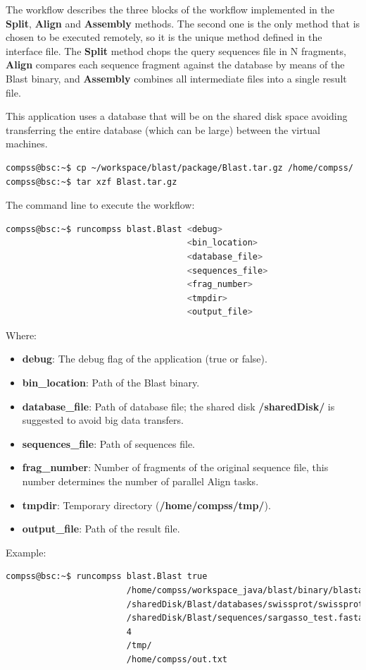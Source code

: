 The workflow describes the three blocks of the workflow implemented in the {\bf Split}, {\bf Align} and 
{\bf Assembly} methods. The second one is the only method that is chosen to be executed remotely, so it 
is the unique method defined in the interface file. The {\bf Split} method chops the query sequences file 
in N fragments, {\bf Align} compares each sequence fragment against the database by means of the Blast 
binary, and {\bf Assembly} combines all intermediate files into a single result file.

This application uses a database that will be on the shared disk space avoiding transferring the entire 
database (which can be large) between the virtual machines.

\begin{lstlisting}[language=bash]
compss@bsc:~$ cp ~/workspace/blast/package/Blast.tar.gz /home/compss/
compss@bsc:~$ tar xzf Blast.tar.gz
\end{lstlisting}

The command line to execute the workflow:

\begin{lstlisting}[language=bash]
compss@bsc:~$ runcompss blast.Blast <debug> 
                                    <bin_location>
                                    <database_file> 
                                    <sequences_file>
                                    <frag_number> 
                                    <tmpdir>
                                    <output_file>
\end{lstlisting}

Where:
\begin{itemize}
 \item {\bf debug}: The debug flag of the application (true or false).
 \item {\bf bin\_location}: Path of the Blast binary.
 \item {\bf database\_file}: Path of database file; the shared disk {\bf /sharedDisk/} is suggested to avoid big data transfers.
 \item {\bf sequences\_file}: Path of sequences file.
 \item {\bf frag\_number}: Number of fragments of the original sequence file, this number determines the number of parallel Align tasks.
 \item {\bf tmpdir}: Temporary directory ({\bf /home/compss/tmp/}).
 \item {\bf output\_file}: Path of the result file.
\end{itemize}
 
Example:
\begin{lstlisting}[language=bash]
compss@bsc:~$ runcompss blast.Blast true
                        /home/compss/workspace_java/blast/binary/blastall
                        /sharedDisk/Blast/databases/swissprot/swissprot
                        /sharedDisk/Blast/sequences/sargasso_test.fasta 
                        4 
                        /tmp/
                        /home/compss/out.txt
\end{lstlisting}